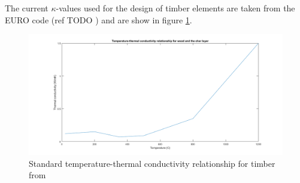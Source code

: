 	

	
	The current $\kappa$-values used for the design of timber elements are taken from the EURO code (ref TODO \citep{Euro:2004}) and are show in figure \ref{kvalue_fig}.  
	\begin{figure}[H]
	\label{kvalue_fig}
	\centering
	\includegraphics[width = \linewidth]{figures/kvalues_euro.png}
	\caption{Standard temperature-thermal conductivity relationship for timber from \citep{Euro:2004}}
	\end{figure}
	
